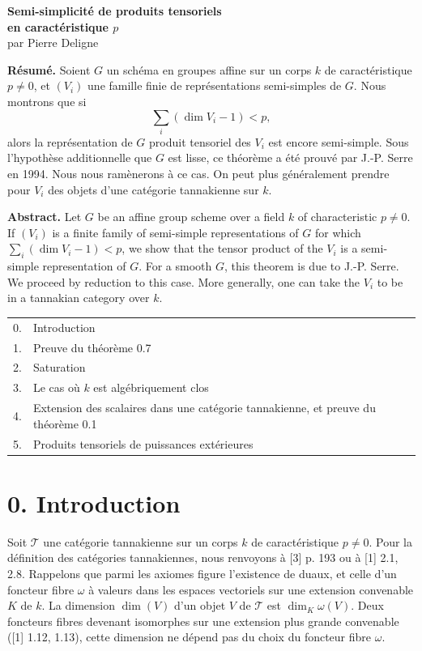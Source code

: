 \documentclass[10pt]{article}
\newcommand{\T}{\mathcal T}
\theoremstyle{deligne}
\begin{document}
\begin{center}
{\Large\bfseries Semi-simplicité de produits tensoriels\\
en caractéristique \(p\)}\\[0.5em]
{\large par Pierre Deligne}
\end{center}

\textbf{Résumé.} Soient \(G\) un schéma en groupes affine sur un corps \(k\) de caractéristique \(p\ne0\), et \((V_i)\) une famille finie de représentations semi-simples de \(G\). Nous montrons que si
\[
  \sum_i(\dim V_i-1)<p,
\]
alors la représentation de \(G\) produit tensoriel des \(V_i\) est encore semi-simple. Sous l'hypothèse additionnelle que \(G\) est lisse, ce théorème a été prouvé par J.-P. Serre en 1994. Nous nous ramènerons à ce cas. On peut plus généralement prendre pour \(V_i\) des objets d'une catégorie tannakienne sur \(k\).

\textbf{Abstract.} Let \(G\) be an affine group scheme over a field \(k\) of characteristic \(p\ne0\). If \((V_i)\) is a finite family of semi-simple representations of \(G\) for which \(\sum_i(\dim V_i-1)<p\), we show that the tensor product of the \(V_i\) is a semi-simple representation of \(G\). For a smooth \(G\), this theorem is due to J.-P. Serre. We proceed by reduction to this case. More generally, one can take the \(V_i\) to be in a tannakian category over \(k\).

\begin{center}
\begin{tabular}{rl}
0. & Introduction\\
1. & Preuve du théorème 0.7\\
2. & Saturation\\
3. & Le cas où \(k\) est algébriquement clos\\
4. & Extension des scalaires dans une catégorie tannakienne, et preuve du théorème 0.1\\
5. & Produits tensoriels de puissances extérieures
\end{tabular}
\end{center}

\section*{0. Introduction}

Soit \(\T\) une catégorie tannakienne sur un corps \(k\) de caractéristique \(p\ne0\). Pour la définition des catégories tannakiennes, nous renvoyons à [3] p. 193 ou à [1] 2.1, 2.8. Rappelons que parmi les axiomes figure l'existence de duaux, et celle d'un foncteur fibre \(\omega\) à valeurs dans les espaces vectoriels sur une extension convenable \(K\) de \(k\). La dimension \(\dim(V)\) d'un objet \(V\) de \(\T\) est \(\dim_K\omega(V)\). Deux foncteurs fibres devenant isomorphes sur une extension plus grande convenable ([1] 1.12, 1.13), cette dimension ne dépend pas du choix du foncteur fibre \(\omega\).
\end{document}

